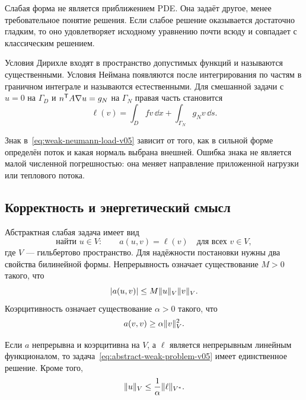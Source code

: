 Слабая форма не является приближением PDE. Она задаёт другое, менее требовательное понятие решения. Если слабое решение оказывается достаточно гладким, то оно удовлетворяет исходному уравнению почти всюду и совпадает с классическим решением.

Условия Дирихле входят в пространство допустимых функций и называются существенными. Условия Неймана появляются после интегрирования по частям в граничном интеграле и называются естественными. Для смешанной задачи с $u=0$ на $\Gamma_D$ и $n^{\mathsf{T}}A\nabla u=g_N$ на $\Gamma_N$ правая часть становится
\begin{equation}
\label{eq:weak-neumann-load-v05}
 \ell(v)
 =
 \int_D fv\,\dd x
 +
 \int_{\Gamma_N}g_Nv\,\dd s.
\end{equation}

\begin{caution}
Знак в~\eqref{eq:weak-neumann-load-v05} зависит от того, как в сильной форме определён поток и какая нормаль выбрана внешней. Ошибка знака не является малой численной погрешностью: она меняет направление приложенной нагрузки или теплового потока.
\end{caution}

\subsection{Корректность и энергетический смысл}

Абстрактная слабая задача имеет вид
\begin{equation}
\label{eq:abstract-weak-problem-v05}
 \text{найти }u\in V:
 \qquad
 a(u,v)=\ell(v)
 \quad
 \text{для всех }v\in V,
\end{equation}
где $V$ --- гильбертово пространство. Для надёжности постановки нужны два свойства билинейной формы. Непрерывность означает существование $M>0$ такого, что
\begin{equation}
\label{eq:bilinear-continuity-v05}
 \lvert a(u,v)\rvert
 \leq
 M\lVert u\rVert_V\lVert v\rVert_V.
\end{equation}
Коэрцитивность означает существование $\alpha>0$ такого, что
\begin{equation}
\label{eq:bilinear-coercivity-v05}
 a(v,v)
 \geq
 \alpha\lVert v\rVert_V^2.
\end{equation}

\begin{theorem}
Если $a$ непрерывна и коэрцитивна на $V$, а $\ell$ является непрерывным линейным функционалом, то задача~\eqref{eq:abstract-weak-problem-v05} имеет единственное решение. Кроме того,
\begin{equation}
\label{eq:lax-milgram-stability-v05}
 \lVert u\rVert_V
 \leq
 \frac{1}{\alpha}\lVert\ell\rVert_{V^*}.
\end{equation}
\end{theorem}

